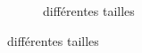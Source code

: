 \documentclass{clic_latex_beamer}
\begin{document}
\begin{frame}
\begin{figure}
\begin{subfigure}[b]{0.3\textwidth}
                \caption*{différentes tailles}
        \end{subfigure}
    \end{figure}
 \end{frame}
 
 
\end{document}
